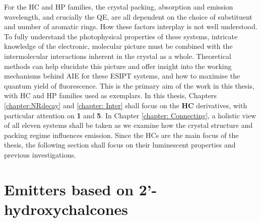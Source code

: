 For the \ac{HC} and \ac{HP} families, the crystal packing, absorption and emission wavelength, and crucially the QE, are all dependent on the choice of substituent and number of aromatic rings. How these factors interplay is not well understood. To fully understand the photophysical properties of these systems, intricate knowledge of the electronic, molecular picture must be combined with the intermolecular interactions inherent in the crystal as a whole. Theoretical methods can help elucidate this picture and offer insight into the working mechanisms behind \ac{AIE} for these \ac{ESIPT} systems, and how to maximise the quantum yield of fluorescence. This is the primary aim of the work in this thesis, with \ac{HC} and \ac{HP} families used as exemplars. In this thesis, Chapters \ref{chapter:NRdecay} and \ref{chapter: Inter} shall focus on the \textbf{HC} derivatives, with particular attention on \textbf{1} and \textbf{5}. In Chapter \ref{chapter: Connecting}, a holistic view of all eleven systems shall be taken as we examine how the crystal structure and packing regime influences emission. Since the \acp{HC} are the main focus of the thesis, the following section shall focus on their luminescent properties and previous investigations.  
\section{Emitters based on 2'-hydroxychalcones}\label{section: lom HC}
